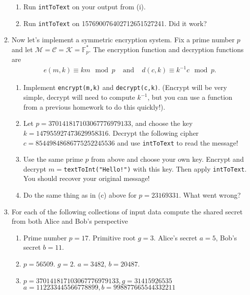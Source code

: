 \documentclass[11pt]{article}
\newcommand{\bF}{\mathbb{F}}
\newcommand{\cC}{\mathcal{C}}
\newcommand{\cK}{\mathcal{K}}
\newcommand{\cM}{\mathcal{M}}
\begin{document}
\begin{enumerate}
{\begin{enumerate}
{\begin{enumerate}
      \item{Run \verb|intToText| on your output from (i).}
      \item{Run \verb|intToText| on 157690076402712651527241.  Did it work?}
    \end{enumerate}
    }
  \end{enumerate}
  }
  \item{
  Now let's implement a symmetric encryption system.  Fix a prime number $p$ and let $\cM = \cC = \cK = \bF_p^*$.  The encryption function and decryption functions are
  \begin{eqnarray*}
    e(m,k)\equiv km\mod p&\text{    and    }&d(c,k)\equiv k^{-1}c\mod p.
  \end{eqnarray*}
  \begin{enumerate}
    \item{
    Implement \verb|encrypt(m,k)| and \verb|decrypt(c,k)|.  (Encrypt will be very simple, decrypt will need to compute $k^{-1}$, but you can use a function from a previous homework to do this quickly!).
    }
    \item{
     Let $p = 370141817103067776979133$, and choose the key $k=147955927473629958316$.  Decrypt the following cipher $c=85449848686775252245536$ and use \verb|intToText| to read the message!
    }
    \item{
    Use the same prime $p$ from above and choose your own key.  Encrypt and decrypt $m=$\verb|textToInt("Hello!")| with this key.  Then apply \verb|intToText|.  You should recover your original message!
    }
    \item{
    Do the same thing as in (c) above for $p=23169331$.  What went wrong?
    }
  \end{enumerate}
  }
  \item{For each of the following collections of input data compute the shared secret from both Alice and Bob's perspective
  \begin{enumerate}
    \item{
    Prime number $p = 17$.  Primitive root $g=3$.  Alice's secret $a=5$, Bob's secret $b = 11$.
    }
    \item{
    $p = 56509$.  $g=2$. $a = 3482$, $b=20487$.
    }
    \item{
    $p = 370141817103067776979133,g=31415926535$\\
    $a = 112233445566778899,b=998877665544332211$
    }
  \end{enumerate}
  }
\end{enumerate}
\end{document}
